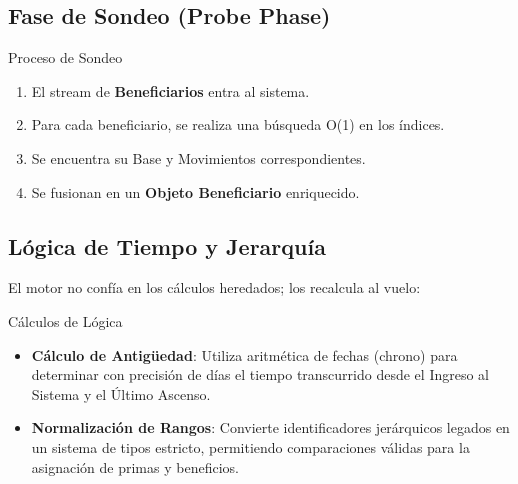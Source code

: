 
\bigskip

\subsection{Fase de Sondeo (Probe Phase)}

\begin{caja}{Proceso de Sondeo}
\begin{enumerate}
\item El stream de \textbf{Beneficiarios} entra al sistema.
\item Para cada beneficiario, se realiza una búsqueda O(1) en los índices.
\item Se encuentra su Base y Movimientos correspondientes.
\item Se fusionan en un \textbf{Objeto Beneficiario} enriquecido.
\end{enumerate}
\end{caja}


\bigskip

\subsection{Lógica de Tiempo y Jerarquía}

El motor no confía en los cálculos heredados; los recalcula al vuelo:

\begin{caja}{Cálculos de Lógica}
\begin{itemize}
\item \textbf{Cálculo de Antigüedad}: Utiliza aritmética de fechas (chrono) para determinar con precisión de días el tiempo transcurrido desde el Ingreso al Sistema y el Último Ascenso.
\item \textbf{Normalización de Rangos}: Convierte identificadores jerárquicos legados en un sistema de tipos estricto, permitiendo comparaciones válidas para la asignación de primas y beneficios.
\end{itemize}
\end{caja}


